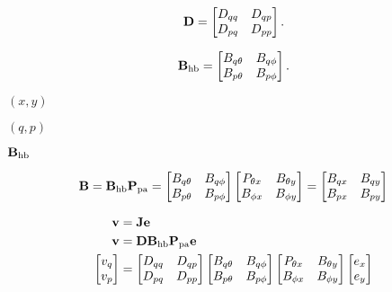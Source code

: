 \documentclass{article}
\begin{document}
\[ {\bf D} = \begin{bmatrix} D_{qq} & D_{qp} \\ D_{pq} & D_{pp} \end{bmatrix}. \]
\pagebreak

\[ {\bf B}_\text{hb} = \begin{bmatrix} B_{q\theta} & B_{q\phi} \\ B_{p\theta} & B_{p\phi} \end{bmatrix}. \]
\pagebreak

$(x,y)$
\pagebreak

$(q,p)$
\pagebreak

${\bf B}_\text{hb}$
\pagebreak

\[ {\bf B} = {\bf B}_\text{hb}{\bf P}_\text{pa} = \begin{bmatrix} B_{q\theta} & B_{q\phi} \\ B_{p\theta} & B_{p\phi} \end{bmatrix} \begin{bmatrix} P_{\theta x} & B_{\theta y} \\ B_{\phi x} & B_{\phi y} \end{bmatrix} = \begin{bmatrix} B_{qx} & B_{qy} \\ B_{px} & B_{py} \end{bmatrix} \]
\pagebreak

\[ \begin{aligned} {\bf v} &= {\bf J}{\bf e} \\ {\bf v} &= {\bf D} {\bf B}_\text{hb} {\bf P}_\text{pa} {\bf e} \\ \begin{bmatrix} v_q \\ v_p \end{bmatrix} &= \begin{bmatrix} D_{qq} & D_{qp} \\ D_{pq} & D_{pp} \end{bmatrix} \begin{bmatrix} B_{q\theta} & B_{q\phi} \\ B_{p\theta} & B_{p\phi} \end{bmatrix} \begin{bmatrix} P_{\theta x} & B_{\theta y} \\ B_{\phi x} & B_{\phi y} \end{bmatrix} \begin{bmatrix} e_x \\ e_y \end{bmatrix} \end{aligned} \]
\pagebreak
\end{document}
